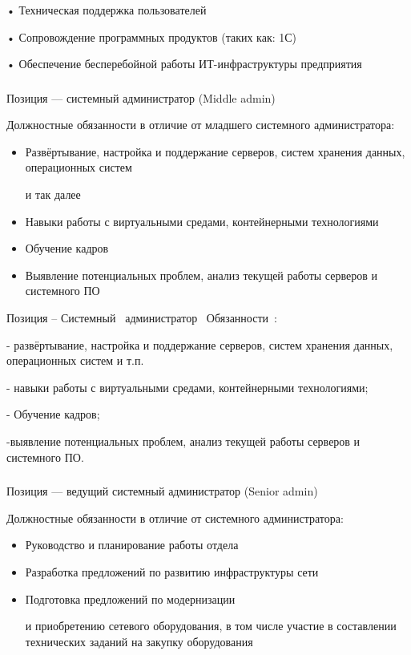 \documentclass{../industrial-development}
\begin{document}
•	Техническая поддержка пользователей

•	Сопровождение программных продуктов (таких как: 1С)

•	Обеспечение бесперебойной работы ИТ-инфраструктуры предприятия

\begin{frame} \frametitle{}
 \begin{block}{}
  \alert{Позиция --- системный администратор (Middle admin)}

Должностные обязанности в отличие от младшего системного администратора: 
  \end{block}
  \begin{itemize}
  \item   Развёртывание, настройка и поддержание серверов, систем хранения данных, операционных систем

 и так далее
  \item Навыки работы с виртуальными средами, контейнерными технологиями
  \item Обучение кадров
 \item Выявление потенциальных проблем, анализ текущей работы серверов и системного ПО
  \end{itemize}
\end{frame}

\lecturenotes

Позиция – Системный~\cite{hh} администратор~\cite{itcf}
Обязанности~\cite{rab}:

- развёртывание, настройка и поддержание серверов, систем хранения данных, операционных систем и т.п.

- навыки работы с виртуальными средами, контейнерными технологиями;

- Обучение кадров;

-выявление потенциальных проблем, анализ текущей работы серверов и системного ПО.

\begin{frame} \frametitle{ }
 \begin{block}{}
  \alert{Позиция --- ведущий системный администратор (Senior admin)}

Должностные обязанности в отличие от системного администратора: 
  \end{block}
  \begin{itemize}
  \item   Руководство и планирование работы отдела
  \item  Разработка предложений по развитию инфраструктуры сети
  \item Подготовка предложений по модернизации 

и приобретению сетевого оборудования, в том числе участие в составлении технических заданий на закупку оборудования
  \end{itemize}
\end{frame}
\end{document}
